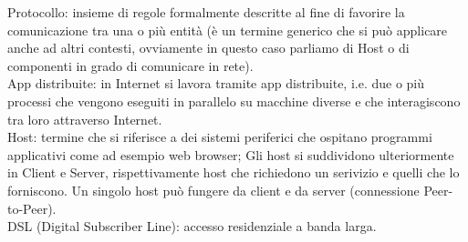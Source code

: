  \noindent {}Protocollo: insieme di regole formalmente descritte al fine di favorire la comunicazione tra una o più entità (è un termine generico che si può applicare anche ad altri contesti, ovviamente in questo caso parliamo di Host o di componenti in grado di comunicare in rete).\\

 \noindent App distribuite: in Internet si lavora tramite app distribuite, i.e. due o più processi che vengono eseguiti in parallelo su macchine diverse e che interagiscono tra loro attraverso Internet. \\

 \noindent Host: termine che si riferisce a dei sistemi periferici che ospitano programmi applicativi come ad esempio web browser; Gli host si suddividono ulteriormente in Client e Server, rispettivamente host che richiedono un serivizio e quelli che lo forniscono. Un singolo host può fungere da client e da server (connessione Peer-to-Peer). \\

\noindent {}DSL (Digital Subscriber Line): accesso residenziale a banda larga. \\ 


